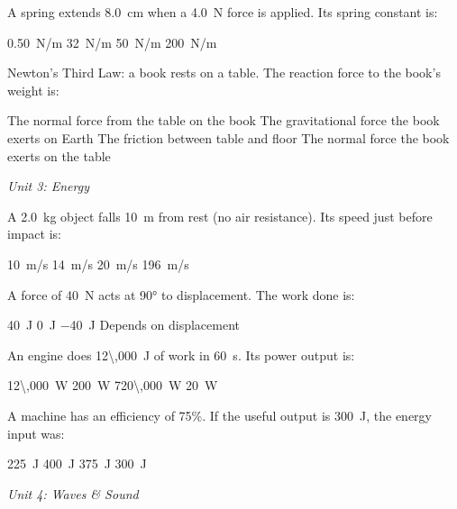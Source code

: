\documentclass[addpoints]{exam}
\begin{document}
\begin{questions}
\question[1] A spring extends \SI{8.0}{cm} when a \SI{4.0}{N} force is applied.
Its spring constant is:
\begin{choices}
    \choice \SI{0.50}{N/m}
    \choice \SI{32}{N/m}
    \correctchoice \SI{50}{N/m}
    \choice \SI{200}{N/m}
\end{choices}

\question[1] Newton's Third Law: a book rests on a table. The reaction force to the
book's weight is:
\begin{choices}
    \choice The normal force from the table on the book
    \correctchoice The gravitational force the book exerts on Earth
    \choice The friction between table and floor
    \choice The normal force the book exerts on the table
\end{choices}

\vspace{3mm}
\noindent\textit{Unit 3: Energy}
\vspace{3mm}

\question[1] A \SI{2.0}{kg} object falls \SI{10}{m} from rest (no air resistance).
Its speed just before impact is:
\begin{choices}
    \choice \SI{10}{m/s}
    \correctchoice \SI{14}{m/s}
    \choice \SI{20}{m/s}
    \choice \SI{196}{m/s}
\end{choices}

\question[1] A force of \SI{40}{N} acts at \ang{90} to displacement. The work done is:
\begin{choices}
    \choice \SI{40}{J}
    \correctchoice \SI{0}{J}
    \choice \SI{-40}{J}
    \choice Depends on displacement
\end{choices}

\question[1] An engine does \SI{12\,000}{J} of work in \SI{60}{s}. Its power output is:
\begin{choices}
    \choice \SI{12\,000}{W}
    \correctchoice \SI{200}{W}
    \choice \SI{720\,000}{W}
    \choice \SI{20}{W}
\end{choices}

\question[1] A machine has an efficiency of 75\%. If the useful output is \SI{300}{J},
the energy input was:
\begin{choices}
    \choice \SI{225}{J}
    \correctchoice \SI{400}{J}
    \choice \SI{375}{J}
    \choice \SI{300}{J}
\end{choices}

\vspace{3mm}
\noindent\textit{Unit 4: Waves \& Sound}
\vspace{3mm}


\end{questions}
\end{document}
